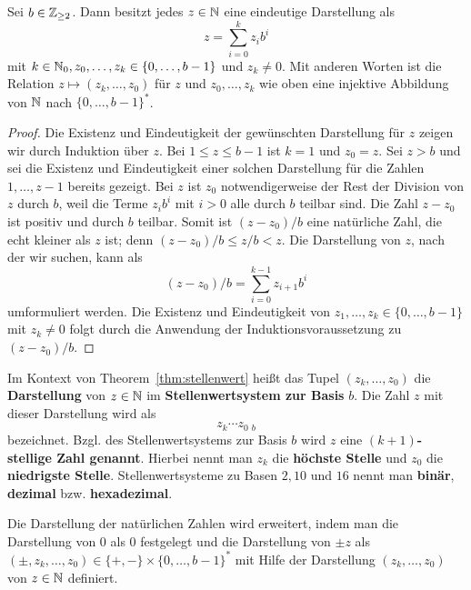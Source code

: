 \begin{thm} \label{thm:stellenwert}
	Sei $b \in \mathbb{Z}_{\ge 2}$. Dann besitzt jedes $z \in \mathbb{N}$ eine eindeutige Darstellung als 
	\begin{equation}\label{z:zur:Basis:b}
		z = \sum_{i=0}^k z_i b^i
	\end{equation}
	mit $k \in \mathbb{N}_0, z_0,\ldots,z_k \in \{0,\ldots,b-1\}$ und $z_k \ne 0$. Mit anderen Worten ist die Relation $z \mapsto (z_k,\ldots,z_0)$ für $z$ und $z_0,\ldots,z_k$ wie oben eine injektive Abbildung von $\mathbb{N}$ nach $\{0,\ldots,b-1\}^\ast$.
\end{thm}
\begin{proof}
 	Die Existenz und Eindeutigkeit der gewünschten Darstellung für $z$ zeigen wir durch Induktion über $z$. Bei $1 \le z \le b-1$ ist $k=1$ und $z_0=z$. Sei $z>b$ und sei die Existenz und Eindeutigkeit einer solchen Darstellung für die Zahlen $1,\ldots,z-1$ bereits gezeigt. Bei $z$ ist $z_0$ notwendigerweise der Rest der Division von $z$ durch $b$, weil die Terme $z_i b^i$ mit $i>0$ alle durch $b$ teilbar sind. Die Zahl $z-z_0$ ist positiv und durch $b$ teilbar. Somit ist $(z-z_0) / b$ eine natürliche Zahl, die echt kleiner als $z$ ist; denn $(z-z_0)/b \le z / b < z$. Die Darstellung von $z$, nach der wir suchen, kann als 
 	\[
 		(z-z_0)/b = \sum_{i=0}^{k-1} z_{i+1} b^i
 	\]
 	umformuliert werden. Die Existenz und Eindeutigkeit von $z_1,\ldots,z_k \in \{0,\ldots,b-1\}$ mit $z_k \ne 0$ folgt durch die Anwendung der Induktionsvoraussetzung zu $(z-z_0)/b$. 
\end{proof} 

\begin{defn}
	Im Kontext von Theorem~\ref{thm:stellenwert} heißt das Tupel $(z_k,\ldots,z_0)$ die \textbf{Darstellung} von $z \in \mathbb{N}$ im \textbf{Stellenwertsystem zur Basis} $b$. Die Zahl $z$ mit dieser Darstellung wird als 
	\[	
			z_k \cdots z_0 \ {}_{b}
	\]
	bezeichnet. Bzgl. des Stellenwertsystems zur Basis $b$ wird $z$ eine \textbf{$(k+1)$-stellige Zahl genannt}. Hierbei nennt man $z_k$ die \textbf{höchste Stelle} und $z_0$ die \textbf{niedrigste Stelle}.  Stellenwertsysteme zu Basen $2, 10$ und $16$ nennt man \textbf{binär}, \textbf{dezimal} bzw. \textbf{hexadezimal}. 
	
	Die Darstellung der natürlichen Zahlen wird  erweitert, indem man die Darstellung von $0$ als $0$ festgelegt und die Darstellung von $\pm z$ als $(\pm ,z_k,\ldots,z_0) \in \{+,-\} \times \{0,\ldots,b-1\}^\ast$ mit Hilfe der Darstellung $(z_k,\ldots,z_0)$  von $z \in \mathbb{N}$ definiert. 
\end{defn} 

